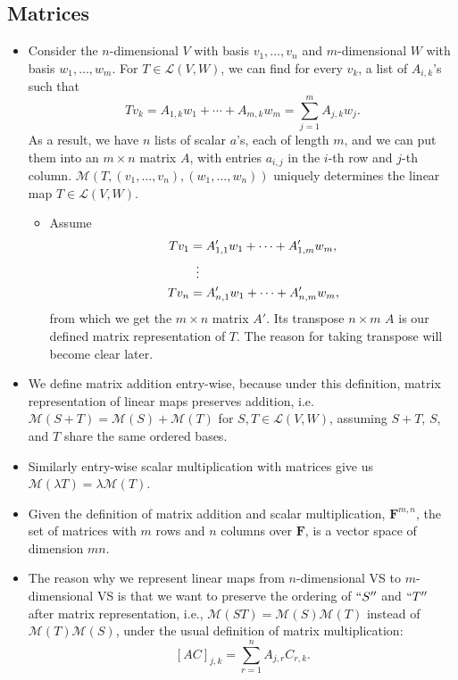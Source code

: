 \documentclass{article}
\newcommand{\F}{\mathbf{F}}
\newcommand{\LVW}{\mathcal{L}(V,W)}
\newcommand{\M}{\mathcal{M}}
\newcommand{\bv}{v_1,\dots,v_n}
\newcommand{\bw}{w_1,\dots,w_n}
\begin{document}
\subsection{Matrices}
\begin{itemize}
    \item Consider the $n$-dimensional $V$ with basis $\bv$ and $m$-dimensional $W$ with basis $w_1,\dots,w_m$. For $T \in \LVW$, we can find for every $v_k$, a list of $A_{i,k}$'s such that \[Tv_k = A_{1,k}w_1 +\cdots+ A_{m,k}w_m = \sum_{j=1}^m A_{j,k}w_j.\] As a result, we have $n$ lists of scalar $a$'s, each of length $m$, and we can put them into an $m \times n$ matrix $A$, with entries $a_{i,j}$ in the $i$-th row and $j$-th column. $\mathcal{M}(T,(\bv),(\bw))$ uniquely determines the linear map $T \in \LVW$.
    \begin{itemize}
        \item Assume
        \begin{align*}
            Tv_1 & = A'_{1,1} w_1 + \dots + A'_{1,m} w_m, \\
            & \vdotswithin{=} \\
            Tv_n & = A'_{n,1} w_1 + \dots + A'_{n,m} w_m,
        \end{align*}
        from which we get the $m \times n$ matrix $A'$. Its transpose $n \times m$ $A$ is our defined matrix representation of $T$. The reason for taking transpose will become clear later.
    \end{itemize}
    \item We define matrix addition entry-wise, because under this definition, matrix representation of linear maps preserves addition, i.e. $\M(S+T) = \M(S) + \M(T)$ for $S,T \in \LVW$, assuming $S+T$, $S$, and $T$ share the same ordered bases.
    \item Similarly entry-wise scalar multiplication with matrices give us $\M(\lambda T) = \lambda \M(T)$.
    \item Given the definition of matrix addition and scalar multiplication, $\F^{m,n}$, the set of matrices with $m$ rows and $n$ columns over $\F$, is a vector space of dimension $mn$.
    \item The reason why we represent linear maps from $n$-dimensional VS to $m$-dimensional VS is that we want to preserve the ordering of $``S''$ and $``T''$ after matrix representation, i.e., $\M(ST) = \M(S)\M(T)$ instead of $\M(T)\M(S)$, under the usual definition of matrix multiplication: $$[AC]_{j,k} = \sum_{r = 1}^n A_{j,r}C_{r,k}.$$
    \begin{itemize}

\end{itemize}
\end{itemize}
\end{document}
